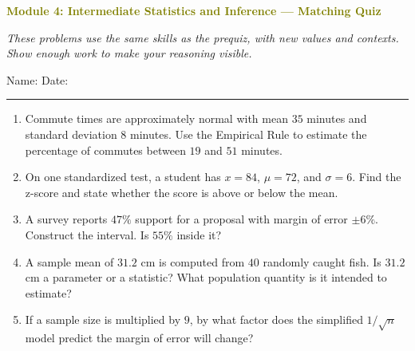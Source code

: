 \documentclass[11pt]{article}
\newcommand{\quizhead}[2]{%
  \clearpage
  {\Large\bfseries\textcolor{olive}{Module #1: #2 — Matching Quiz}}\par
  \textit{These problems use the same skills as the prequiz, with new values and contexts. Show enough work to make your reasoning visible.}\par
  Name: \hspace{2.6in} Date: \hspace{1.1in}\par
  \vspace{2pt}\textcolor{gold}{\rule{\linewidth}{1.2pt}}\par\smallskip
}
\newcommand{\workmed}{\par\vspace{0.62in}}
\begin{document}
\quizhead{4}{Intermediate Statistics and Inference}
\begin{enumerate}
\item Commute times are approximately normal with mean \(35\) minutes and standard deviation \(8\) minutes. Use the Empirical Rule to estimate the percentage of commutes between \(19\) and \(51\) minutes.
\workmed

\item On one standardized test, a student has \(x=84\), \(\mu=72\), and \(\sigma=6\). Find the z-score and state whether the score is above or below the mean.
\workmed

\item A survey reports \(47\%\) support for a proposal with margin of error \(\pm6\%\). Construct the interval. Is \(55\%\) inside it?
\workmed

\item A sample mean of \(31.2\) cm is computed from \(40\) randomly caught fish. Is \(31.2\) cm a parameter or a statistic? What population quantity is it intended to estimate?
\workmed

\item If a sample size is multiplied by \(9\), by what factor does the simplified \(1/\sqrt n\) model predict the margin of error will change?
\workmed
\end{enumerate}
\end{document}
